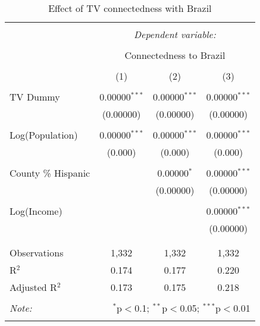 
\begin{table}[!htbp] \centering 
  \caption{Effect of TV connectedness with Brazil} 
  \label{} 
\begin{tabular}{@{\extracolsep{-5pt}}lccc} 
\\[-1.8ex]\hline 
\hline \\[-1.8ex] 
 & \multicolumn{3}{c}{\textit{Dependent variable:}} \\ 
\cline{2-4} 
\\[-1.8ex] & \multicolumn{3}{c}{Connectedness to Brazil} \\ 
\\[-1.8ex] & (1) & (2) & (3)\\ 
\hline \\[-1.8ex] 
 TV Dummy & 0.00000$^{***}$ & 0.00000$^{***}$ & 0.00000$^{***}$ \\ 
  & (0.00000) & (0.00000) & (0.00000) \\ 
  & & & \\ 
 Log(Population) & 0.00000$^{***}$ & 0.00000$^{***}$ & 0.00000$^{***}$ \\ 
  & (0.000) & (0.000) & (0.000) \\ 
  & & & \\ 
 County \% Hispanic &  & 0.00000$^{*}$ & 0.00000$^{***}$ \\ 
  &  & (0.00000) & (0.00000) \\ 
  & & & \\ 
 Log(Income) &  &  & 0.00000$^{***}$ \\ 
  &  &  & (0.00000) \\ 
  & & & \\ 
\hline \\[-1.8ex] 
Observations & 1,332 & 1,332 & 1,332 \\ 
R$^{2}$ & 0.174 & 0.177 & 0.220 \\ 
Adjusted R$^{2}$ & 0.173 & 0.175 & 0.218 \\ 
\hline 
\hline \\[-1.8ex] 
\textit{Note:}  & \multicolumn{3}{r}{$^{*}$p$<$0.1; $^{**}$p$<$0.05; $^{***}$p$<$0.01} \\ 
 & \multicolumn{3}{r}{} \\ 
\end{tabular} 
\end{table} 
